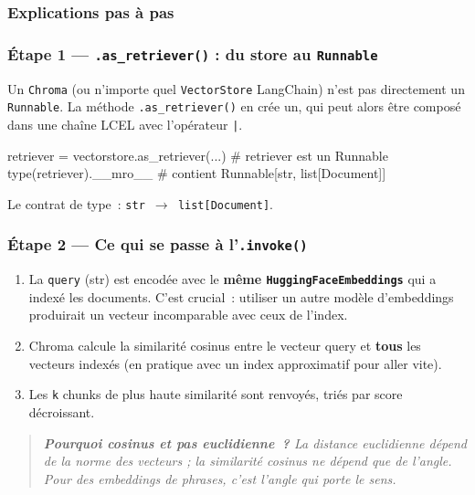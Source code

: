 \documentclass[11pt,a4paper]{article}
\begin{document}
\subsubsection{Explications pas à pas}

\subsubsection*{Étape 1 — \texttt{.as\_retriever()} : du store au \texttt{Runnable}}

Un \texttt{Chroma} (ou n'importe quel \texttt{VectorStore} LangChain)
n'est pas directement un \texttt{Runnable}. La méthode
\texttt{.as\_retriever()} en crée un, qui peut alors être composé dans
une chaîne LCEL avec l'opérateur \texttt{|}.

\begin{pythoncode}
retriever = vectorstore.as_retriever(...)
# retriever est un Runnable
type(retriever).__mro__   # contient Runnable[str, list[Document]]
\end{pythoncode}

Le contrat de type~: \texttt{str $\to$ list[Document]}.

\subsubsection*{Étape 2 — Ce qui se passe à l'\texttt{.invoke()}}

\begin{enumerate}[leftmargin=*]
  \item La \texttt{query} (str) est encodée avec le \textbf{même
        \texttt{HuggingFaceEmbeddings}} qui a indexé les documents.
        C'est crucial~: utiliser un autre modèle d'embeddings produirait
        un vecteur incomparable avec ceux de l'index.
  \item Chroma calcule la similarité cosinus entre le vecteur query et
        \textbf{tous} les vecteurs indexés (en pratique avec un index
        approximatif pour aller vite).
  \item Les \texttt{k} chunks de plus haute similarité sont renvoyés,
        triés par score décroissant.
\end{enumerate}

\begin{quote}\itshape
\textbf{Pourquoi cosinus et pas euclidienne~?} La distance euclidienne
dépend de la norme des vecteurs ; la similarité cosinus ne dépend que de
l'angle. Pour des embeddings de phrases, c'est l'angle qui porte le sens.
\end{quote}
\end{document}
